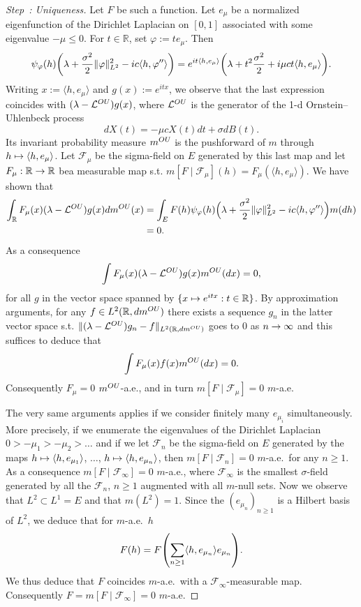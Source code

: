 \documentclass[AHL,Unicode,longabstracts]{cedram}
\theoremstyle{plain}
\newcommand{\cF}{\mathcal{F}}
\newcommand{\cL}{\mathcal{L}}
\newcommand{\R}{\mathbb{R}}
\let\originalleft\left
\let\originalright\right
\renewcommand{\left}{\mathopen{}\mathclose\bgroup\originalleft}
\renewcommand{\right}{\aftergroup\egroup\originalright}
\newcounter{setofstep}
\newcounter{step}[setofstep]
\newenvironment{step}[1][]{\refstepcounter{step}\begin{proof}[{Step~\thestep\if#1\empty\else: #1\fi}]}{\let\qed\relax\end{proof}}
\renewcommand*{\to}{\mathchoice{\longrightarrow}{\rightarrow}{\rightarrow}{\rightarrow}}
\let\oldmapsto\mapsto
\renewcommand*{\mapsto}{\mathchoice{\longmapsto}{\oldmapsto}{\oldmapsto}{\oldmapsto}}
\begin{document}
\begin{proofc}
\begin{step}[{Uniqueness}]
Let $F$ be such a function. Let $e_\mu$ be a normalized eigenfunction of the Dirichlet Laplacian on $[0,1]$ associated with some eigenvalue $-\mu \le 0$. For $t\in\R$, set $\varphi := t e_\mu$. Then
\[
\psi_\varphi(h)\left(\lambda + \frac{\sigma^2}{2} \| \varphi\|_{L^2}^2 - ic \langle h,\varphi''\rangle\right) = e^{it \langle h,e_\mu\rangle} \left(\lambda +t^2 \frac{\sigma^2}{2} + i \mu c t \langle h,e_\mu\rangle\right).
\]
Writing $x := \langle h,e_\mu\rangle$ and $g(x) := e^{itx}$, we observe that the last expression coincides with $(\lambda - \cL^{\tiny OU})g(x)$, where $\cL^{\tiny OU}$ is the generator of the 1-d Ornstein--Uhlenbeck process
\[
dX(t) = -\mu c X(t) dt + \sigma dB(t).
\]
Its invariant probability measure $m^{\tiny OU}$ is the pushforward of $m$ through $h\mapsto \langle h,e_\mu\rangle$. Let $\cF_\mu$ be the sigma-field on $E$ generated by this last map and let $F_\mu:\R\to\R$ be\linebreak a measurable map s.t. $m[F \mid \cF_\mu](h) = F_\mu(\langle h,e_\mu\rangle)$. We have shown that
\begin{align*}
\int_\R F_\mu(x) (\lambda - \cL^{\tiny OU})g(x) dm^{\tiny OU}(x) &= \int_E F(h) \psi_\varphi(h) \Big(\lambda + \frac{\sigma^2}{2} \| \varphi\|_{L^2}^2 - ic \langle h,\varphi''\rangle \Big) m(dh)\\
&=0.
\end{align*}
As a consequence
\[
\int F_\mu(x) (\lambda - \cL^{\tiny OU})g(x) m^{\tiny OU}(dx) =0,
\]
for all $g$ in the vector space spanned by $\{x\mapsto e^{itx}: t\in \R\}$. By approximation arguments, for any $f\in L^2(\R,dm^{\tiny OU})$ there exists a sequence $g_n$ in the latter vector space s.t. $\|(\lambda - \cL^{\tiny OU}) g_n - f\|_{L^2(\R,dm^{\tiny OU})}$ goes to $0$ as $n\to\infty$ and this suffices to deduce that
\[
\int F_\mu(x) f(x) m^{\tiny OU}(dx) =0.
\]
Consequently $F_\mu = 0$ $m^{\tiny OU}$-a.e., and in turn $m[F \mid \cF_\mu]= 0$ $m$-a.e.

The very same arguments applies if we consider finitely many $e_{\mu_i}$ simultaneously. More precisely, if we enumerate the eigenvalues of the Dirichlet Laplacian $0 > -\mu_1 > -\mu_2 > \dots$ and if we let $\cF_n$ be the sigma-field on $E$ generated by the maps $h\mapsto \langle h,e_{\mu_1}\rangle$, $\dots$, $h\mapsto \langle h,e_{\mu_n}\rangle$, then $m[F \mid \cF_n]= 0$ $m$-a.e.~for any $n\ge 1$. As a consequence $m[F \mid \cF_\infty]= 0$ $m$-a.e., where $\cF_\infty$ is the smallest $\sigma$-field generated by all the $\cF_n$, $n\ge 1$ augmented with all $m$-null sets. Now we observe that $L^2 \subset L^1 = E$ and that $m(L^2) = 1$. Since the $(e_{\mu_n})_{n\ge 1}$ is a Hilbert basis of $L^2$, we deduce that for $m$-a.e.~$h$
\[
F(h) = F\left(\sum_{n\ge 1} \langle h,e_{\mu_n}\rangle e_{\mu_n}\right).
\]
We thus deduce that $F$ coincides $m$-a.e.~with a $\cF_\infty$-measurable map. Consequently $F=m[F \mid \cF_\infty]= 0$ $m$-a.e.\qedhere
\end{step}\let\qed\relax
\end{proofc}
\end{document}
